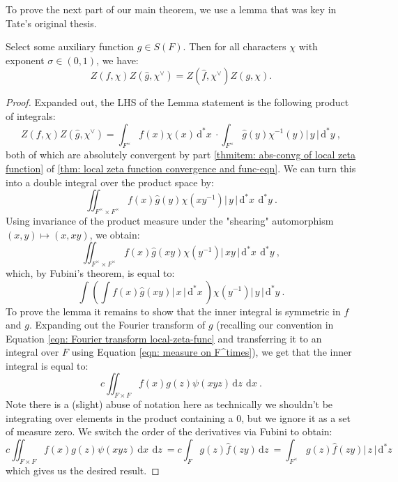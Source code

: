 \documentclass[11pt, x11names]{book}
\renewcommand{\brack}[1]{\left(   #1 \right)}
\newcommand{\abs}[1]{\left| \, #1  \,\right|}
\renewcommand{\hat}{\widehat}
\newcommand{\inv}[1]{#1^{-1}}
\newcommand{\dx}{\, \mathrm{d}x \ }
\newcommand{\dz}{\, \mathrm{d}z \ }
\renewcommand{\d}[1]{\, \mathrm{d}#1 \ }
\begin{document}
To prove the next part of our main theorem, we use a lemma that was key in Tate's original thesis. 
\begin{lemma}
\label{lemma: local-zeta-func func eqn}
    Select some auxiliary function $g \in S(F)$. Then for all characters $\chi$ with exponent $\sigma \in (0, 1)$, we have:
    \begin{equation*}
        Z(f, \chi) Z(\hat{g}, \chi^\lor) = Z(\hat{f}, \chi^\lor)Z(g, \chi).
    \end{equation*}
\end{lemma}
\begin{proof}
Expanded out, the LHS of the Lemma statement is the following product of integrals:
\begin{equation*}
    Z(f, \chi) Z(\hat{g}, \chi^\lor) = \int_{F^\times} f(x) \chi(x) \d{^*x} \cdot \int_{F^\times} \hat{g}(y) \inv{\chi}(y) \abs{y} \d{^*y},
\end{equation*}
both of which are absolutely convergent by part \ref{thmitem: abs-convg of local zeta function} of \ref{thm: local zeta function convergence and func-eqn}. We can turn this into a double integral over the product space by:
\begin{equation*}
    \iint_{F^\times \times F^\times} f(x)\hat{g}(y) \chi(x \inv{y}) \abs{y} \d{^*x} \d{^*y}.
\end{equation*}
Using invariance of the product measure under the "shearing" automorphism $(x, y) \mapsto (x, xy)$, we obtain:
\begin{equation*}
    \iint_{F^\times \times F^\times} f(x)\hat{g}(xy)\chi(\inv{y}) \abs{xy} \d{^*x} \d{^*y},
\end{equation*}
which, by Fubini's theorem, is equal to:
\begin{equation*}
    \int \brack{\int f(x)\hat{g}(xy) \abs{x} \d{^*x}} \chi(\inv{y}) \abs{y} \d{^*y}.
\end{equation*}
To prove the lemma it remains to show that the inner integral is symmetric in $f$ and $g$. Expanding out the Fourier transform of $g$ (recalling our convention in Equation \ref{eqn: Fourier transform local-zeta-func} and transferring it to an integral over $F$ using Equation \ref{eqn: measure on F^times}), we get that the inner integral is equal to:
\begin{equation*}
    c \iint_{F \times F} f(x) g(z) \psi(xyz) \dz \dx.
\end{equation*}
Note there is a (slight) abuse of notation here as technically we shouldn't be integrating over elements in the product containing a 0, but we ignore it as a set of measure zero. We switch the order of the derivatives via Fubini to obtain:
\begin{equation*}
    c \iint_{F \times F} f(x) g(z) \psi(xyz) \dx \dz = c \int_F g(z) \hat{f}(zy) \dz = \int_{F^\times}  g(z) \hat{f}(zy) \abs{z} \d{^*z}
\end{equation*}
which gives us the desired result.
\end{proof}
\end{document}
